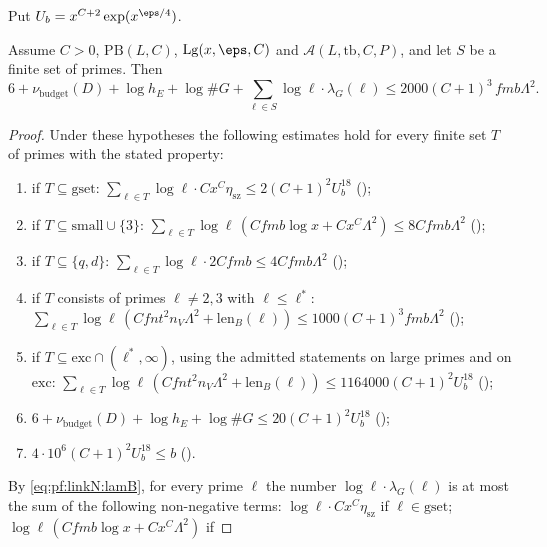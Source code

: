 Put $U_b=x^{C+2}\exp(x^{\eps/4})$.

\begin{proposition}\label{pf:linkN:pointbound}
Assume $C>0$, $\mathrm{PB}(L,C)$, $\mathrm{Lg}(x,\eps,C)$ and $\mathcal A(L,\mathrm{tb},C,P)$, and let $S$ be a finite set of primes. Then
\[
6+\nu_{\mathrm{budget}}(D)+\log h_E+\log\#G+\sum_{\ell\in S}\log\ell\cdot\lambda_G(\ell)\le2000(C+1)^3\,fmb\Lambda^2.
\]
\end{proposition}

\begin{proof}
Under these hypotheses the following estimates hold for every finite set $T$ of primes with the stated property:
\begin{enumerate}[label=(\roman*)]
\item if $T\subseteq\mathrm{gset}$: $\sum_{\ell\in T}\log\ell\cdot Cx^C\eta_{\mathrm{sz}}\le2(C+1)^2U_b^{18}$
();
\item if $T\subseteq\mathrm{small}\cup\{3\}$: $\sum_{\ell\in T}\log\ell\,(Cfmb\log x+Cx^C\Lambda^2)\le8Cfmb\Lambda^2$
();
\item if $T\subseteq\{q,d\}$: $\sum_{\ell\in T}\log\ell\cdot2Cfmb\le4Cfmb\Lambda^2$
();
\item if $T$ consists of primes $\ell\ne2,3$ with $\ell\le\ell^*$:
$\sum_{\ell\in T}\log\ell\,(Cfnt^2n_V\Lambda^2+\mathrm{len}_B(\ell))\le1000(C+1)^3fmb\Lambda^2$
();
\item if $T\subseteq\mathrm{exc}\cap(\ell^*,\infty)$, using the admitted statements on large primes and on $\mathrm{exc}$:
$\sum_{\ell\in T}\log\ell\,(Cfnt^2n_V\Lambda^2+\mathrm{len}_B(\ell))\le1164000(C+1)^2U_b^{18}$
();
\item $6+\nu_{\mathrm{budget}}(D)+\log h_E+\log\#G\le20(C+1)^2U_b^{18}$ ();
\item $4\cdot10^6(C+1)^2U_b^{18}\le b$ ().
\end{enumerate}
By \eqref{eq:pf:linkN:lamB}, for every prime $\ell$ the number $\log\ell\cdot\lambda_G(\ell)$ is at most the sum of the following
non-negative terms: $\log\ell\cdot Cx^C\eta_{\mathrm{sz}}$ if $\ell\in\mathrm{gset}$; $\log\ell\,(Cfmb\log x+Cx^C\Lambda^2)$ if

\end{proof}
